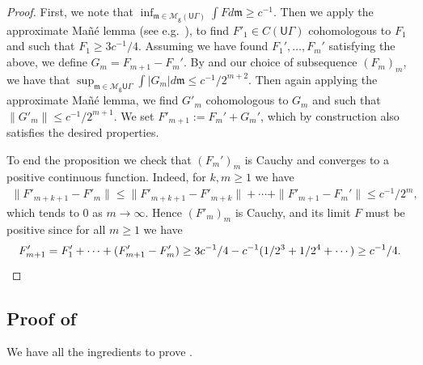 \documentclass[twoside]{amsart}
\theoremstyle{definition}
\numberwithin{equation}{section}
\numberwithin{theorem}{section}
\newcommand{\msf}[1]{\mathsf{#1}}
\newcommand{\calM}{\mathcal{M}}
\newcommand{\frakm}{\mathfrak{m}}
\newcommand{\G}{\Gamma}
\newcommand{\UG}{\msf{U}\G}
\newcommand{\vg}{\msf{g}}
\begin{document}
\begin{proof}
First, we note that $\inf_{\frakm\in \calM_{\vg}(\UG)}{\int{F}d\frakm}\geq c^{-1}$. Then we apply the approximate Ma\~{n}\'e lemma (see e.g.~\cite[Lemma~3.1]{pavez-molina}), to find $F'_1\in C(\UG)$ cohomologous to $F_1$ and such that $F_1\geq 3c^{-1}/4$. Assuming we have found $F_1',\dots,F_m'$ satisfying the above, we define $G_m=F_{m+1}-F_{m}'$. By  and our choice of subsequence $(F_m)_m$, we have that $\sup_{\frakm\in \calM_{\vg}{\UG}}{\int |G_m|d\frakm}\leq c^{-1}/2^{m+2}$. Then again applying the approximate Ma\~{n}\'e lemma, we find $G'_m$ cohomologous to $G_m$ and such that $\|G'_m\|\leq c^{-1}/2^{m+1}$. We set $F'_{m+1}:=F_m'+G_m'$, which by construction also satisfies the desired properties.  

To end the proposition we check that $(F_m')_m$ is Cauchy and converges to a positive continuous function. Indeed, for $k,m\geq 1$ we have
\begin{align*}
    \|F'_{m+k+1}-F'_{m}\|\leq \|F'_{m+k+1}-F'_{m+k}\|+\cdots +\|F'_{m+1}-F_m'\|\leq c^{-1}/2^{m},
\end{align*}
which tends to 0 as $m\to \infty$. Hence $(F'_m)_m$ is Cauchy, and its limit $F$ must be positive since for all $m\geq 1$ we have
\[F_{m+1}'=F'_1+\cdots+(F_{m+1}'-F_m')\geq 3c^{-1}/4-c^{-1}(1/2^3+1/2^4+\cdots)\geq c^{-1}/4. \qedhere\]   
\end{proof}










\subsection{Proof of }

We have all the ingredients to prove .
\end{document}

